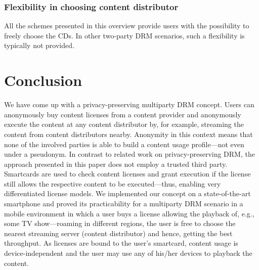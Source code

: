 \documentclass{llncs}
\begin{document}
\subsubsection{Flexibility in choosing content distributor}

All the schemes presented in this overview provide users with the possibility to freely choose the CDs. In other two-party DRM scenarios, such a flexibility is typically not provided. 





\section{Conclusion} \label{conclusion_outlook} 




We have come up with a privacy-preserving multiparty DRM concept. Users can anonymously buy content licenses from a content provider and anonymously execute the content at any content distributor by, for example, streaming the content from content distributors nearby. Anonymity in this context means that none of the involved parties is able to build a content usage profile---not even under a pseudonym. In contrast to related work on privacy-preserving DRM, the approach presented in this paper does not employ a trusted third party. Smartcards are used to check content licenses and grant execution if the license still allows the respective content to be executed---thus, enabling very differentiated license models. We implemented our concept on a state-of-the-art smartphone and proved its practicability for a multiparty DRM scenario in a mobile environment in which a user buys a license allowing the playback of, e.g., some TV show---roaming in different regions, the user is free to choose the nearest streaming server (content distributor) and hence, getting the best throughput. As licenses are bound to the user's smartcard, content usage is device-independent and the user may use any of his/her devices to playback the content. 




 
\end{document}
